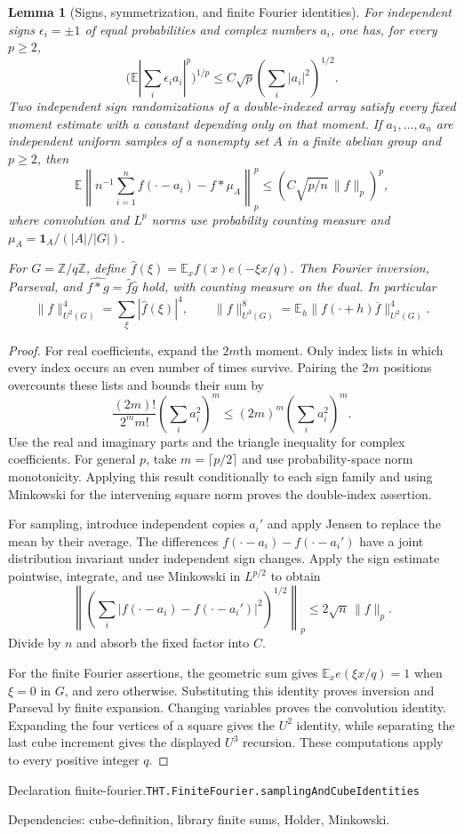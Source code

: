 \documentclass[11pt]{article}
\newtheorem{lemma}[theorem]{Lemma}
\theoremstyle{definition}
\newcommand{\Z}{\mathbb Z}
\newcommand{\E}{\mathbb E}
\newcommand{\one}{\mathbf 1}
\numberwithin{equation}{section}
\newcommand{\bp}[3]{\par\smallskip\begingroup\footnotesize
\noindent\hypertarget{bp:#1}{\textsf{Declaration #1.}}\quad\nolinkurl{#2}\par
\noindent\textsf{Dependencies:} #3.\par\endgroup\smallskip}
\begin{document}
\begin{lemma}[Signs, symmetrization, and finite Fourier identities]\label{lem:finite-fourier}
For independent signs $\epsilon_i=\pm1$ of equal probabilities and complex numbers $a_i$, one has, for every $p\ge2$,
\[
 \bigl(\E|\sum_i\epsilon_i a_i|^p\bigr)^{1/p}
 \le C\sqrt p\left(\sum_i|a_i|^2\right)^{1/2}.
\]
Two independent sign randomizations of a double-indexed array satisfy every fixed moment estimate with a constant depending only on that moment. If $a_1,\ldots,a_n$ are independent uniform samples of a nonempty set $A$ in a finite abelian group and $p\ge2$, then
\[
 \E\left\|n^{-1}\sum_{i=1}^n f(\cdot-a_i)-f*\mu_A\right\|_p^p
 \le\left(C\sqrt{p/n}\,\|f\|_p\right)^p,
\]
where convolution and $L^p$ norms use probability counting measure and $\mu_A=\one_A/(|A|/|G|)$.

For $G=\Z/q\Z$, define $\widehat f(\xi)=\E_x f(x)e(-\xi x/q)$. Then Fourier inversion, Parseval, and $\widehat{f*g}=\widehat f\widehat g$ hold, with counting measure on the dual. In particular
\[
 \|f\|_{U^2(G)}^4=\sum_\xi|\widehat f(\xi)|^4,
 \qquad
 \|f\|_{U^3(G)}^8=\E_h\|f(\cdot+h)\overline f\|_{U^2(G)}^4.
\]
\end{lemma}
\begin{proof}
For real coefficients, expand the $2m$th moment. Only index lists in which every index occurs an even number of times survive. Pairing the $2m$ positions overcounts these lists and bounds their sum by
\[
 \frac{(2m)!}{2^m m!}\left(\sum_i a_i^2\right)^m
 \le (2m)^m\left(\sum_i a_i^2\right)^m.
\]
Use the real and imaginary parts and the triangle inequality for complex coefficients. For general $p$, take $m=\lceil p/2\rceil$ and use probability-space norm monotonicity. Applying this result conditionally to each sign family and using Minkowski for the intervening square norm proves the double-index assertion.

For sampling, introduce independent copies $a_i'$ and apply Jensen to replace the mean by their average. The differences $f(\cdot-a_i)-f(\cdot-a_i')$ have a joint distribution invariant under independent sign changes. Apply the sign estimate pointwise, integrate, and use Minkowski in $L^{p/2}$ to obtain
\[
 \left\|\left(\sum_i|f(\cdot-a_i)-f(\cdot-a_i')|^2\right)^{1/2}\right\|_p
 \le 2\sqrt n\,\|f\|_p.
\]
Divide by $n$ and absorb the fixed factor into $C$.

For the finite Fourier assertions, the geometric sum gives $\E_x e(\xi x/q)=1$ when $\xi=0$ in $G$, and zero otherwise. Substituting this identity proves inversion and Parseval by finite expansion. Changing variables proves the convolution identity. Expanding the four vertices of a square gives the $U^2$ identity, while separating the last cube increment gives the displayed $U^3$ recursion. These computations apply to every positive integer $q$.
\end{proof}
\bp{finite-fourier}{THT.FiniteFourier.samplingAndCubeIdentities}{cube-definition, library finite sums, Holder, Minkowski}
\end{document}
